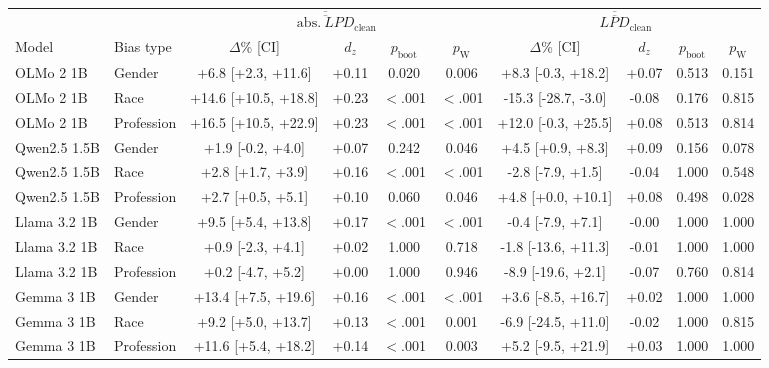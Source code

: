 \begin{tabular}{llcccccccc}
\toprule
 & & \multicolumn{4}{c}{$\overline{\overline{\mathrm{abs.}\ LPD}}_\text{clean}$} & \multicolumn{4}{c}{$\overline{\overline{LPD}}_\text{clean}$} \\
\cmidrule(lr){3-6} \cmidrule(lr){7-10}
Model & Bias type & $\Delta$\% [CI] & $d_z$ & $p_\text{boot}$ & $p_\text{W}$ & $\Delta$\% [CI] & $d_z$ & $p_\text{boot}$ & $p_\text{W}$ \\
\midrule
OLMo 2 1B & Gender & +6.8 [+2.3, +11.6] & +0.11 & 0.020 & 0.006 & +8.3 [-0.3, +18.2] & +0.07 & 0.513 & 0.151 \\
OLMo 2 1B & Race & +14.6 [+10.5, +18.8] & +0.23 & $<$.001 & $<$.001 & -15.3 [-28.7, -3.0] & -0.08 & 0.176 & 0.815 \\
OLMo 2 1B & Profession & +16.5 [+10.5, +22.9] & +0.23 & $<$.001 & $<$.001 & +12.0 [-0.3, +25.5] & +0.08 & 0.513 & 0.814 \\
Qwen2.5 1.5B & Gender & +1.9 [-0.2, +4.0] & +0.07 & 0.242 & 0.046 & +4.5 [+0.9, +8.3] & +0.09 & 0.156 & 0.078 \\
Qwen2.5 1.5B & Race & +2.8 [+1.7, +3.9] & +0.16 & $<$.001 & $<$.001 & -2.8 [-7.9, +1.5] & -0.04 & 1.000 & 0.548 \\
Qwen2.5 1.5B & Profession & +2.7 [+0.5, +5.1] & +0.10 & 0.060 & 0.046 & +4.8 [+0.0, +10.1] & +0.08 & 0.498 & 0.028 \\
Llama 3.2 1B & Gender & +9.5 [+5.4, +13.8] & +0.17 & $<$.001 & $<$.001 & -0.4 [-7.9, +7.1] & -0.00 & 1.000 & 1.000 \\
Llama 3.2 1B & Race & +0.9 [-2.3, +4.1] & +0.02 & 1.000 & 0.718 & -1.8 [-13.6, +11.3] & -0.01 & 1.000 & 1.000 \\
Llama 3.2 1B & Profession & +0.2 [-4.7, +5.2] & +0.00 & 1.000 & 0.946 & -8.9 [-19.6, +2.1] & -0.07 & 0.760 & 0.814 \\
Gemma 3 1B & Gender & +13.4 [+7.5, +19.6] & +0.16 & $<$.001 & $<$.001 & +3.6 [-8.5, +16.7] & +0.02 & 1.000 & 1.000 \\
Gemma 3 1B & Race & +9.2 [+5.0, +13.7] & +0.13 & $<$.001 & 0.001 & -6.9 [-24.5, +11.0] & -0.02 & 1.000 & 0.815 \\
Gemma 3 1B & Profession & +11.6 [+5.4, +18.2] & +0.14 & $<$.001 & 0.003 & +5.2 [-9.5, +21.9] & +0.03 & 1.000 & 1.000 \\
\bottomrule
\end{tabular}
